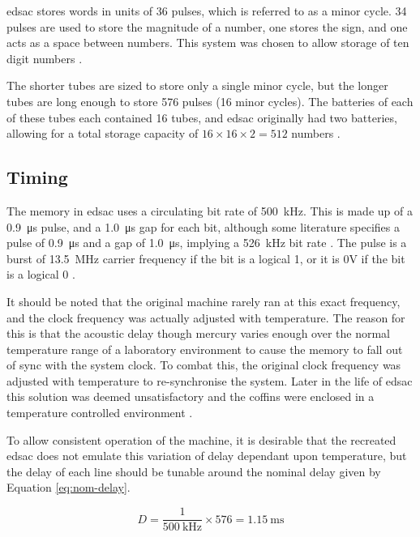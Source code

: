 \Gls{edsac} stores words in units of 36 pulses, which is referred to as a minor cycle. 34 pulses are used to store the magnitude of a number, one stores the sign, and one acts as a space between numbers. This system was chosen to allow storage of ten digit numbers \cite[p.209]{wilkes1948}. 

The shorter tubes are sized to store only a single minor cycle, but the longer tubes are long enough to store 576 pulses (16 minor cycles). The batteries of each of these tubes each contained 16 tubes, and \gls{edsac} originally had two batteries, allowing for a total storage capacity of $16 \times 16 \times 2 = 512$ numbers \cite[p.210]{wilkes1948}.

\subsection{Timing} \label{sec:review-delay-timing}
The memory in \gls{edsac} uses a circulating bit rate of \SI{500}{\kilo\hertz}. This is made up of a \SI{0.9}{\micro\second} pulse, and a \SI{1.0}{\micro\second} gap for each bit, although some literature specifies a pulse of \SI{0.9}{\micro\second} and a gap of  \SI{1.0}{\micro\second}, implying a \SI{526}{\kilo\hertz} bit rate \cite[p.209]{wilkes1948} \cite[p.2]{cambridge1948}. The pulse is a burst of \SI{13.5}{\mega\hertz} carrier frequency if the bit is a logical 1, or it is 0V if the bit is a logical 0 \cite[p.2]{cambridge1948}.

It should be noted that the original machine rarely ran at this exact frequency, and the clock frequency was actually adjusted with temperature. The reason for this is that the acoustic delay though mercury varies enough over the normal temperature range of a laboratory environment to cause the memory to fall out of sync with the system clock. To combat this, the original clock frequency was adjusted with temperature to re-synchronise the system. Later in the life of \gls{edsac} this solution was deemed unsatisfactory and the coffins were enclosed in a temperature controlled environment \cite[p.81]{wilkes1952}.

To allow consistent operation of the machine, it is desirable that the recreated \gls{edsac} does not emulate this variation of delay dependant upon temperature, but the delay of each line should be tunable around the nominal delay given by Equation \ref{eq:nom-delay}.

\newcommand{\nominalLongTubeDelayMs}{1.15}

\begin{equation}
	D = \frac{1}{\SI{500}{\kilo\hertz}} \times 576 = \SI{\nominalLongTubeDelayMs}{\milli\second}  \label{eq:nom-delay}
\end{equation}


